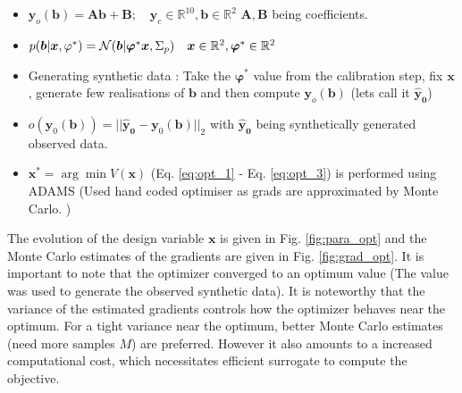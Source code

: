 \documentclass[a4paper,11pt]{article}
\begin{document}
\begin{itemize}
    \item $\bm{y}_o(\bm b) = \bm A \bm b + \bm B; \quad \bm{y}_c \in \mathbb{R}^{10}, \bm b \in \mathbb{R}^2$ \quad {} $\bm A, \bm B$ being coefficients. 
    \item $p(\boldsymbol{b} | \boldsymbol{x}, \varphi^*) = \mathcal{N}(\boldsymbol{b}| \bm \varphi^* \bm x, \Sigma_p) \quad \bm x \in \mathbb{R}^2, \bm \varphi^* \in \mathbb{R}^{2}$
    \item Generating synthetic data : Take the $\bm \varphi^*$ value from the calibration step, fix $\bm x$, generate few realisations of $\bm b$ and then compute $\bm{y}_o(\bm b)$ (lets call it $\bm{\hat{y}_0}$)
    \item $o(\bm{y}_0(\bm{b})) = || \bm{\hat{y}_0} - \bm{y}_0(\bm{b}) ||_2 $ with $\bm{\hat{y}_0}$ being synthetically generated observed data.
    \item $\bm x^*  = \arg \min V(\bm x)$ (Eq. \ref{eq:opt_1} - Eq. \ref{eq:opt_3}) is performed using ADAMS (Used hand coded optimiser as grads are approximated by Monte Carlo. )
\end{itemize}

The evolution of the design variable $\bm x$ is given in Fig. \ref{fig:para_opt} and the Monte Carlo estimates of the gradients are given in Fig. \ref{fig:grad_opt}. It is important to note that the optimizer converged to an optimum value (The value was used to generate the observed synthetic data). It is noteworthy that the variance of the estimated gradients controls how the optimizer behaves near the optimum. For a tight variance near the optimum, better Monte Carlo estimates (need more samples $M$) are preferred. However it also amounts to a increased computational cost, which necessitates efficient surrogate to compute the objective.
\end{document}
